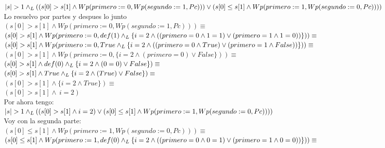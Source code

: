\documentclass[10pt,a4paper]{article}
\begin{document}
\begin{enumerate}
$|s| > 1 \land _L ((s[0] > s[1] \land Wp(primero:= 0, Wp(segundo:= 1, Pc))) \lor (s[0] \leq s[1] \land Wp(primero:= 1, Wp(segundo:= 0, Pc))))$
\vspace{0.3cm}
\\
Lo resuelvo por partes y despues lo junto
\vspace{0.3cm}
\\
$(s[0] > s[1] \land Wp(primero:= 0, Wp(segundo:= 1, Pc))) \equiv$
\vspace{0.3cm}
\\
$(s[0] > s[1] \land Wp(primero:= 0, def(1) \land _L \{i = 2 \land ((primero = 0 \land 1 = 1) \lor (primero = 1 \land 1 = 0))\})) \equiv$
\vspace{0.3cm}
\\
$(s[0] > s[1] \land Wp(primero:= 0, True \land _L \{i = 2 \land ((primero = 0 \land True) \lor (primero = 1 \land False))\})) \equiv$
\vspace{0.3cm}
\\
$(s[0] > s[1] \land Wp(primero:= 0, \{i = 2 \land (primero = 0) \lor False\})) \equiv$
\vspace{0.3cm}
\\
$(s[0] > s[1] \land def(0) \land _L \{i = 2 \land (0 = 0) \lor False\}) \equiv$
\vspace{0.3cm}
\\
$(s[0] > s[1] \land True \land _L \{i = 2 \land (True) \lor False\}) \equiv$
\vspace{0.3cm}
\\
$(s[0] > s[1] \land\{i = 2 \land True\}) \equiv$
\vspace{0.3cm}
\\
$(s[0] > s[1] \land\ i = 2)$
\vspace{0.3cm}
\\
Por ahora tengo:
\vspace{0.3cm}
\\
$|s| > 1 \land _L ((s[0] > s[1] \land i = 2) \lor (s[0] \leq s[1] \land Wp(primero:= 1, Wp(segundo:= 0, Pc))))$
\vspace{0.3cm}
\\
Voy con la segunda parte:
\vspace{0.3cm}
\\
$(s[0] \leq s[1] \land Wp(primero:= 1, Wp(segundo:= 0, Pc)))\equiv$
\vspace{0.3cm}
\\
$(s[0] \leq s[1] \land Wp(primero:= 1, def(0) \land _L \{i = 2 \land ((primero = 0 \land 0 = 1) \lor (primero = 1 \land 0 = 0))\}))\equiv$
\vspace{0.3cm}

\end{enumerate}
\end{document}
